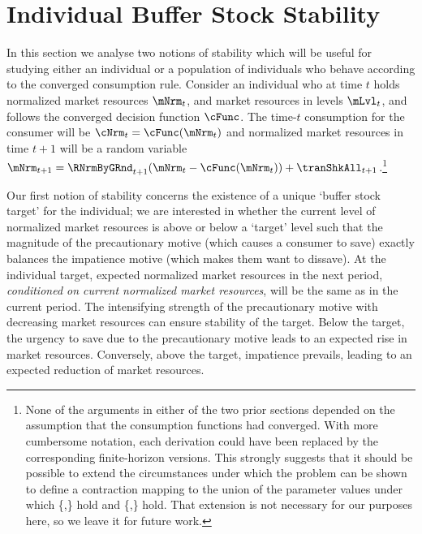 \documentclass[\econtexRoot/BufferStockTheory]{subfiles}
\begin{document}
\hypertarget{Analysis of the Converged Consumption Function}{}
\section{Individual Buffer Stock Stability}\label{sec:individStability}



In this section we analyse two notions of stability which will be useful for studying either an individual or a population of individuals who behave according to the converged consumption rule.
Consider an individual who at time $t$ holds normalized market resources $\mNrm_{t}$, and market resources in levels $\mLvl_{t}$, and follows the converged decision function $\cFunc$.
The time-$t$ consumption for the consumer will be $\cNrm_{t} = \cFunc(\mNrm_{t})$ and normalized market resources in time $t+1$ will be a random variable $\mNrm_{t+1} = \RNrmByGRnd_{t+1}(\mNrm_{t} - \cFunc(\mNrm_{t})) + \tranShkAll_{t+1}$.\footnote{None of the arguments in either of the two prior sections depended on the assumption that the consumption functions had converged.
With more cumbersome notation, each derivation could have been replaced by the corresponding finite-horizon versions.
This strongly suggests that it should be possible to extend the circumstances under which the problem can be shown to define a contraction mapping to the union of the parameter values under which \{\RIC,\FHWC\} hold and \{\FVAC,\WRIC\} hold.
That extension is not necessary for our purposes here, so we leave it for future work.}


Our first notion of stability concerns the existence of a unique `buffer stock target' for the individual; we are interested in whether the current level of normalized market resources is above or below a `target' level such that the magnitude of the precautionary motive (which causes a consumer to save) exactly balances the impatience motive  (which makes them want to dissave).
At the individual target, expected normalized market resources in the next period, \textit{conditioned on current normalized market resources}, will be the same as in the current period.
The intensifying strength of the precautionary motive with decreasing market resources can ensure stability of the target.
Below the target, the urgency to save due to the precautionary motive leads to an expected rise in market resources.
Conversely, above the target, impatience prevails, leading to an expected reduction of market resources.
\end{document}
